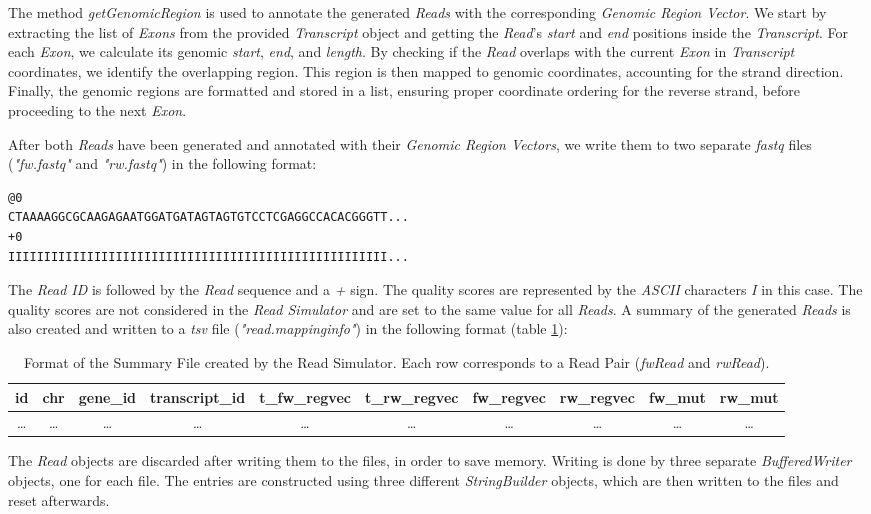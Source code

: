 \documentclass[12pt]{article}
\begin{document}
\begin{enumerate}
		The method \textit{getGenomicRegion} is used to annotate the generated \textit{Reads} with the corresponding \textit{Genomic Region Vector}.
		We start by extracting the list of \textit{Exons} from the provided \textit{Transcript} object and getting the
		\textit{Read}’s \textit{start} and \textit{end} positions inside the \textit{Transcript}. For each \textit{Exon}, we calculate its genomic \textit{start}, \textit{end}, and \textit{length}.
		By checking if the \textit{Read} overlaps with the current \textit{Exon} in \textit{Transcript} coordinates, we identify the overlapping region.
		This region is then mapped to genomic coordinates, accounting for the strand direction.
		Finally, the genomic regions are formatted and stored in a list, ensuring proper coordinate ordering for the reverse strand,
		before proceeding to the next \textit{Exon}.

		After both \textit{Reads} have been generated and annotated with their \textit{Genomic Region Vectors}, we write them to two separate \textit{fastq} files
		(\textit{"fw.fastq"} and \textit{"rw.fastq"}) in the following format:
		\begin{verbatim}
@0
CTAAAAGGCGCAAGAGAATGGATGATAGTAGTGTCCTCGAGGCCACACGGGTT...
+0
IIIIIIIIIIIIIIIIIIIIIIIIIIIIIIIIIIIIIIIIIIIIIIIIIIIII...
    \end{verbatim}
		The \textit{Read ID} is followed by the \textit{Read} sequence and a \textit{+} sign. The quality scores are represented by the \textit{ASCII} characters
		\textit{I} in this case. The quality scores are not considered in the \textit{Read Simulator} and are set to the same value for all \textit{Reads}.
		A summary of the generated \textit{Reads} is also created and written to a \textit{tsv} file (\textit{"read.mappinginfo"}) in the following format (table \ref{tab:summary-format}):


		\setlength{\tabcolsep}{3pt}
		\begin{table}[htpb]
			\centering
			\caption{Format of the Summary File created by the Read Simulator. Each row corresponds to a Read Pair (\textit{fwRead} and \textit{rwRead}).}
			\label{tab:summary-format}
			\small
			\begin{tabular}{|c|c|c|c|c|c|c|c|c|c|}
				\hline
				id    & chr   & gene\_id & transcript\_id & t\_fw\_regvec & t\_rw\_regvec & fw\_regvec & rw\_regvec & fw\_mut & rw\_mut \\ \hline
				\dots & \dots & \dots    & \dots          & \dots         & \dots         & \dots      & \dots      & \dots   & \dots   \\
				\hline
			\end{tabular}
		\end{table}

		The \textit{Read} objects are discarded after writing them to the files, in order to save memory.
		Writing is done by three separate \textit{BufferedWriter} objects, one for each file.
		The entries are constructed using three different \textit{StringBuilder} objects, which are then written to the files and reset afterwards.

\end{enumerate}
\end{document}
